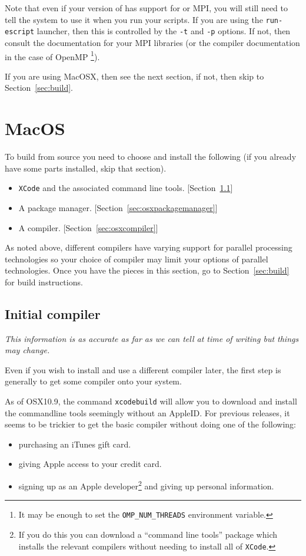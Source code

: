 Note that even if your version of \escript has support for \openmp or MPI, you will still need to tell the system to 
use it when you run your scripts.
If you are using the \texttt{run-escript} launcher, then this is controlled  by the \texttt{-t} and \texttt{-p} options.
If not, then consult the documentation for your MPI libraries (or the compiler documentation in the case of OpenMP
\footnote{It may be enough to set the \texttt{OMP\_NUM\_THREADS} environment variable.}).

If you are using MacOSX, then see the next section, if not, then skip to Section~\ref{sec:build}.

\section{MacOS}

To build \escript from source you need to choose and install the following (if you already have some parts installed, skip 
that section).
\begin{itemize}
 \item \texttt{XCode} and the associated command line tools. [Section~\ref{sec:initcompiler}]
 \item A package manager. [Section~\ref{sec:osxpackagemanager}]
 \item A compiler. [Section~\ref{sec:osxcompiler}] 
\end{itemize}

As noted above, different compilers have varying support for parallel processing technologies so your choice of 
compiler may limit your options of parallel technologies.
Once you have the pieces in this section, go to Section~\ref{sec:build} for build instructions.

\subsection{Initial compiler}\label{sec:initcompiler}
\emph{This information is as accurate as far as we can tell at time of writing but things may change.}

Even if you wish to install and use a different compiler later, the first step is generally 
to get some compiler onto your system.

As of OSX10.9, the command \texttt{xcodebuild} will allow you to download and install the commandline tools seemingly
without an AppleID.
For previous releases, it seems to be trickier to get the basic compiler without doing one of the following:
\begin{itemize}
 \item purchasing an iTunes gift card.
 \item giving Apple access to your credit card.
 \item signing up as an Apple developer\footnote{If you do this you can download a ``command line tools'' package
 which installs the relevant compilers without needing to install all of \texttt{XCode}.}  and giving up personal information.
\end{itemize}

